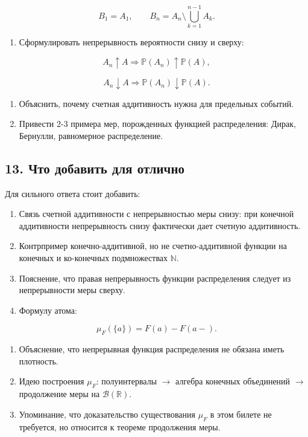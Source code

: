 \documentclass[
  11pt,
  a4paper,
]{article}
\providecommand{\tightlist}{%
  \setlength{\itemsep}{0pt}\setlength{\parskip}{0pt}}
\begin{document}
\[
B_1=A_1,\qquad
B_n=A_n\setminus\bigcup_{k=1}^{n-1}A_k.
\]

\begin{enumerate}
\def\labelenumi{\arabic{enumi}.}
\setcounter{enumi}{3}
\tightlist
\item
  Сформулировать непрерывность вероятности снизу и сверху:
\end{enumerate}

\[
A_n\uparrow A\Rightarrow \mathbb P(A_n)\uparrow\mathbb P(A),
\]

\[
A_n\downarrow A\Rightarrow \mathbb P(A_n)\downarrow\mathbb P(A).
\]

\begin{enumerate}
\def\labelenumi{\arabic{enumi}.}
\setcounter{enumi}{4}
\tightlist
\item
  Объяснить, почему счетная аддитивность нужна для предельных событий.
\item
  Привести 2-3 примера мер, порожденных функцией распределения: Дирак,
  Бернулли, равномерное распределение.
\end{enumerate}

\subsection{13. Что добавить для
отлично}\label{ux447ux442ux43e-ux434ux43eux431ux430ux432ux438ux442ux44c-ux434ux43bux44f-ux43eux442ux43bux438ux447ux43dux43e}

Для сильного ответа стоит добавить:

\begin{enumerate}
\def\labelenumi{\arabic{enumi}.}
\tightlist
\item
  Связь счетной аддитивности с непрерывностью меры снизу: при конечной
  аддитивности непрерывность снизу фактически дает счетную аддитивность.
\item
  Контрпример конечно-аддитивной, но не счетно-аддитивной функции на
  конечных и ко-конечных подмножествах \(\mathbb N\).
\item
  Пояснение, что правая непрерывность функции распределения следует из
  непрерывности меры сверху.
\item
  Формулу атома:
\end{enumerate}

\[
\mu_F(\{a\})=F(a)-F(a-).
\]

\begin{enumerate}
\def\labelenumi{\arabic{enumi}.}
\setcounter{enumi}{4}
\tightlist
\item
  Объяснение, что непрерывная функция распределения не обязана иметь
  плотность.
\item
  Идею построения \(\mu_F\): полуинтервалы \(\to\) алгебра конечных
  объединений \(\to\) продолжение меры на \(\mathcal B(\mathbb R)\).
\item
  Упоминание, что доказательство существования \(\mu_F\) в этом билете
  не требуется, но относится к теореме продолжения меры.
\end{enumerate}
\end{document}
